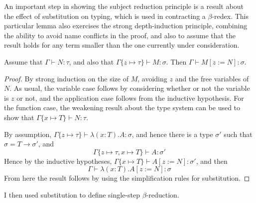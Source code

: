 An important step in showing the subject reduction principle is a result about the effect of substitution on typing, which is used in contracting a \(\beta\)-redex.
This particular lemma also exercises the strong depth-induction principle, combining the ability to avoid name conflicts in the proof, and also to assume that the result holds for any term smaller than the one currently under consideration.

\begin{lemma}
\label{lemma:typing-subst}
Assume that \(\Gamma \vdash N : \tau\), and also that \(\Gamma\{z \mapsto \tau\} \vdash M : \sigma\).
Then \(\Gamma \vdash M[z := N] : \sigma\).
\end{lemma}
\begin{proof}
By strong induction on the size of \(M\), avoiding \(z\) and the free variables of \(N\).
As usual, the variable case follows by considering whether or not the variable is \(z\) or not, and the application case follows from the inductive hypothesis.
For the function case, the weakening result about the type system can be used to show that \(\Gamma\{x \mapsto T\} \vdash N : \tau\).

By assumption, \(\Gamma\{z \mapsto \tau\} \vdash \lambda (x:T).A : \sigma\), and hence there is a type \(\sigma'\) such that \(\sigma = T \to \sigma'\), and
\[
\Gamma\{z \mapsto \tau, x \mapsto T\} \vdash A : \sigma'
\]
Hence by the inductive hypotheses, \(\Gamma\{x \mapsto T\} \vdash A[z := N] : \sigma'\), and then
\[
\Gamma \vdash \lambda (x:T). A[z := N] : \sigma
\]
From here the result follows by using the simplification rules for substitution.
\end{proof}

I then used substitution to define single-step \(\beta\)-reduction.

